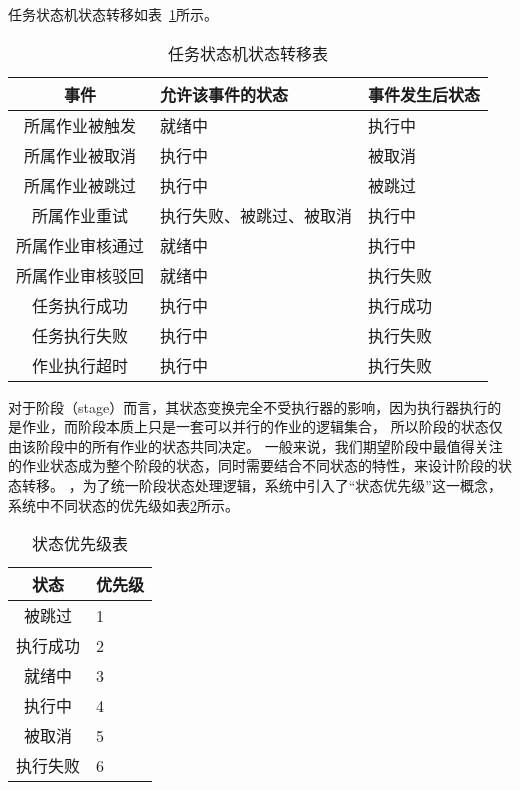 任务状态机状态转移如表~\ref{tab:任务状态机状态转移表}所示。

\begin{table}[h]
  \centering
  \caption{任务状态机状态转移表}
  \label{tab:任务状态机状态转移表}
  \begin{tabular}{cll}
    \toprule
    事件           & 允许该事件的状态          & 事件发生后状态                  \\
    \midrule
    所属作业被触发           & 就绪中                   & 执行中       \\
    所属作业被取消           & 执行中                   & 被取消       \\
    所属作业被跳过           & 执行中                   & 被跳过       \\
    所属作业重试            & 执行失败、被跳过、被取消   & 执行中       \\
    所属作业审核通过        & 就绪中                   & 执行中        \\
    所属作业审核驳回        & 就绪中                   & 执行失败       \\
    任务执行成功            & 执行中      & 执行成功   \\
    任务执行失败            & 执行中      & 执行失败   \\
    作业执行超时            & 执行中      & 执行失败   \\
    \bottomrule
  \end{tabular}
\end{table}

对于阶段（stage）而言，其状态变换完全不受执行器的影响，因为执行器执行的是作业，而阶段本质上只是一套可以并行的作业的逻辑集合，
所以阶段的状态仅由该阶段中的所有作业的状态共同决定。
一般来说，我们期望阶段中最值得关注的作业状态成为整个阶段的状态，同时需要结合不同状态的特性，来设计阶段的状态转移。
，为了统一阶段状态处理逻辑，系统中引入了“状态优先级”这一概念，系统中不同状态的优先级如表\ref{tab:状态优先级表}所示。

\begin{table}[h]
  \centering
  \caption{状态优先级表}
  \label{tab:状态优先级表}
  \begin{tabular}{cl}
    \toprule
    状态           & 优先级                                     \\
    \midrule
    被跳过         & 1         \\
    执行成功       & 2         \\
    就绪中         & 3         \\
    执行中         & 4         \\
    被取消         & 5         \\
    执行失败       & 6         \\
    \bottomrule
  \end{tabular}
\end{table}

